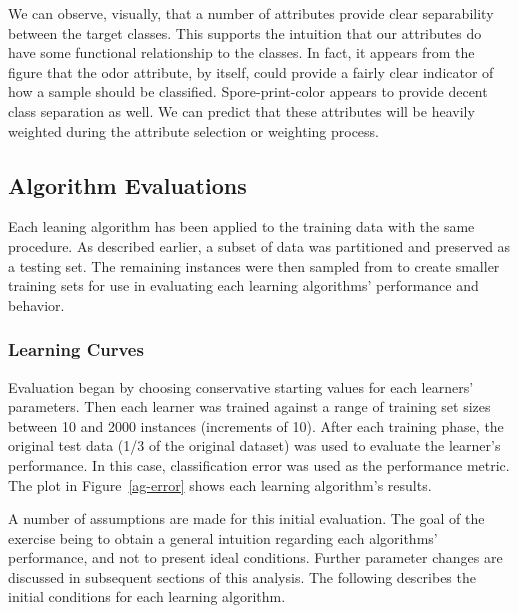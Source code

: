 \documentclass{sig-alternate}
\begin{document}
We can observe, visually, that a number of attributes provide clear separability between the target classes. This supports the intuition that our attributes do have some functional relationship to the classes. In fact, it appears from the figure that the odor attribute, by itself, could provide a fairly clear indicator of how a sample should be classified. Spore-print-color appears to provide decent class separation as well. We can predict that these attributes will be heavily weighted during the attribute selection or weighting process.

\subsection{Algorithm Evaluations}

Each leaning algorithm has been applied to the training data with the same procedure. As described earlier, a subset of data was partitioned and preserved as a testing set. The remaining instances were then sampled from to create smaller training sets for use in evaluating each learning algorithms' performance and behavior.


\subsubsection{Learning Curves}

Evaluation began by choosing conservative starting values for each learners' parameters. Then each learner was trained against a range of training set sizes between 10 and 2000 instances (increments of 10). After each training phase, the original test data (1/3 of the original dataset) was used to evaluate the learner's performance. In this case, classification error was used as the performance metric. The plot in Figure~\ref{ag-error} shows each learning algorithm's results.

A number of assumptions are made for this initial evaluation. The goal of the exercise being to obtain a general intuition regarding each algorithms' performance, and not to present ideal conditions. Further parameter changes are discussed in subsequent sections of this analysis. The following describes the initial conditions for each learning algorithm.
\end{document}
